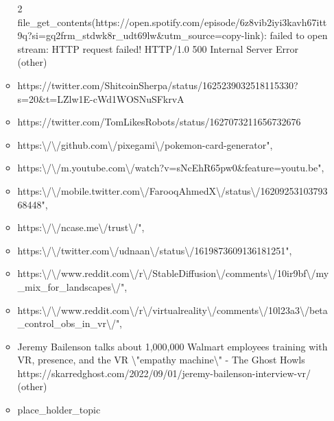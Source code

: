 \begin{itemize}
\begin{itemize}
    2
    file\_get\_contents(https://open.spotify.com/episode/6z8vib2iyi3kavh67itt9q?si=gq2frm\_stdwk8r\_udt69lw\&utm\_source=copy-link):
    failed to open stream: HTTP request failed! HTTP/1.0 500 Internal
    Server Error (other)
  \item
    https://twitter.com/ShitcoinSherpa/status/1625239032518115330?s=20\&t=LZlw1E-cWd1WOSNuSFkrvA
  \item
    https://twitter.com/TomLikesRobots/status/1627073211656732676
  \item
    https:\textbackslash/\textbackslash/github.com\textbackslash/pixegami\textbackslash/pokemon-card-generator",
  \item
    https:\textbackslash/\textbackslash/m.youtube.com\textbackslash/watch?v=sNcEhR65pw0\&feature=youtu.be",
  \item
    https:\textbackslash/\textbackslash/mobile.twitter.com\textbackslash/FarooqAhmedX\textbackslash/status\textbackslash/1620925310379368448",
  \item
    https:\textbackslash/\textbackslash/ncase.me\textbackslash/trust\textbackslash/",
  \item
    https:\textbackslash/\textbackslash/twitter.com\textbackslash/udnaan\textbackslash/status\textbackslash/1619873609136181251",
  \item
    https:\textbackslash/\textbackslash/www.reddit.com\textbackslash/r\textbackslash/StableDiffusion\textbackslash/comments\textbackslash/10ir9bf\textbackslash/my\_mix\_for\_landscapes\textbackslash/",
  \item
    https:\textbackslash/\textbackslash/www.reddit.com\textbackslash/r\textbackslash/virtualreality\textbackslash/comments\textbackslash/10l23a3\textbackslash/beta\_control\_obs\_in\_vr\textbackslash/",
  \item
    Jeremy Bailenson talks about 1,000,000 Walmart employees training
    with VR, presence, and the VR \textbackslash"empathy
    machine\textbackslash" - The Ghost Howls
    https://skarredghost.com/2022/09/01/jeremy-bailenson-interview-vr/
    (other)
  \item
    place\_holder\_topic

    \begin{itemize}
     

\end{itemize}
\end{itemize}
\end{itemize}
